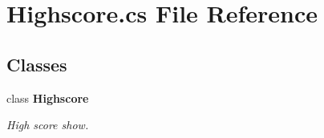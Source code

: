 \section{Highscore.\+cs File Reference}
\label{_highscore_8cs}
\subsection*{Classes}
\begin{DoxyCompactItemize}
\item 
class {\bf Highscore}
\begin{DoxyCompactList}\small\item\em High score show. \end{DoxyCompactList}\end{DoxyCompactItemize}
